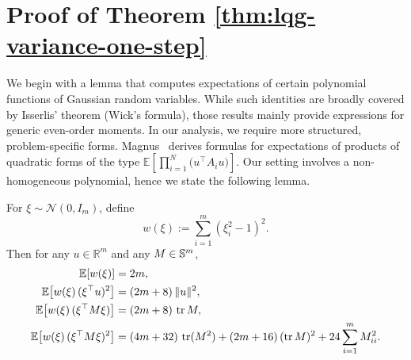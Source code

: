 \section{Proof of Theorem \ref{thm:lqg-variance-one-step}}
\label{sec:app-proof-lqg-variance-one-step}

We begin with a lemma that computes expectations of certain polynomial functions of Gaussian random variables.
While such identities are broadly covered by Isserlis' theorem (Wick's formula), those results mainly provide
expressions for generic even-order moments. In our analysis, we require more structured, problem-specific forms.
Magnus~\cite{magnus78report-gaussianmoments} derives formulas for expectations of products of quadratic forms of the type
$\mathbb{E}\!\left[\prod_{i=1}^{N}\big(u^\top A_i u\big)\right]$.
Our setting involves a non-homogeneous polynomial, hence we state the following lemma.

\begin{lemma}\label{thm:wz_std_lemma}
For $\xi\sim \mathcal N(0,I_m)$, define
\[
w(\xi):=\sum_{i=1}^m (\xi_i^2-1)^2.
\]
Then for any $u\in\mathbb R^m$ and any $M\in \mathbb{S}^{m}$,
\begin{align}
{\mathbb{E}}[w(\xi)] &= 2m, \label{eq:w0}\\
{\mathbb{E}}\big[w(\xi)\,(\xi^\top u)^2\big] &= (2m+8)\,\|u\|^2, \label{eq:w_u}\\
{\mathbb{E}}\big[w(\xi)\,(\xi^\top M \xi)\big] &= (2m+8)\,\operatorname{tr} M, \label{eq:w_M}\\
{\mathbb{E}}\big[w(\xi)\,(\xi^\top M \xi)^2\big]
&= (4m + 32)\,\operatorname{tr}(M^2) + (2m + 16)\,(\operatorname{tr} M)^2 + 24 \sum_{i=1}^m M_{ii}^2.
\label{eq:w_MM}
\end{align}
\end{lemma}

